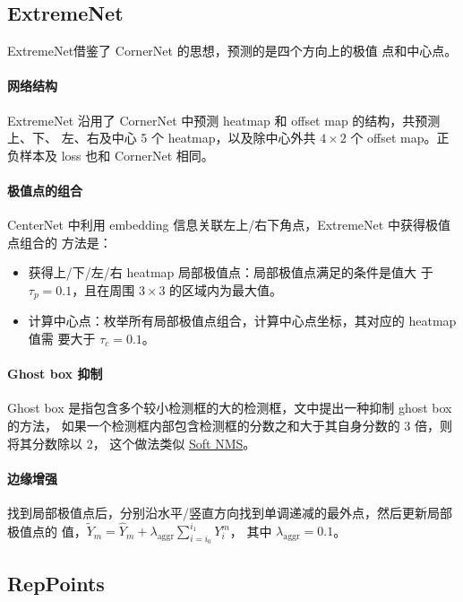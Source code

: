 \subsection{ExtremeNet}\label{sec:ExtremeNet}
ExtremeNet借鉴了 CornerNet 的思想，预测的是四个方向上的极值
点和中心点。

\paragraph{网络结构}
ExtremeNet 沿用了 CornerNet 中预测 heatmap 和 offset map 的结构，共预测上、下、
左、右及中心 5 个 heatmap，以及除中心外共 $4 \times 2$ 个 offset map。正负样本及
loss 也和 CornerNet 相同。

\paragraph{极值点的组合}
CenterNet 中利用 embedding 信息关联左上/右下角点，ExtremeNet 中获得极值点组合的
方法是：

\begin{itemize}
  \item 获得上/下/左/右 heatmap 局部极值点：局部极值点满足的条件是值大
    于 $\tau_p=0.1$，且在周围 $3 \times 3$ 的区域内为最大值。
  \item 计算中心点：枚举所有局部极值点组合，计算中心点坐标，其对应的 heatmap 值需
    要大于 $\tau_c=0.1$。
\end{itemize}

\paragraph{Ghost box 抑制}
Ghost box 是指包含多个较小检测框的大的检测框，文中提出一种抑制 ghost box 的方法，
如果一个检测框内部包含检测框的分数之和大于其自身分数的 3 倍，则将其分数除以 2，
这个做法类似 \hyperref[subsec:soft-nms]{Soft NMS}。

\paragraph{边缘增强}
找到局部极值点后，分别沿水平/竖直方向找到单调递减的最外点，然后更新局部极值点的
值，$\tilde{Y}_m = \hat{Y}_m + \lambda_{\mathrm{aggr}}\sum_{i=i_0}^{i_1}Y_i^m$，
其中 $\lambda_{\mathrm{aggr}}=0.1$。

\subsection{RepPoints}

